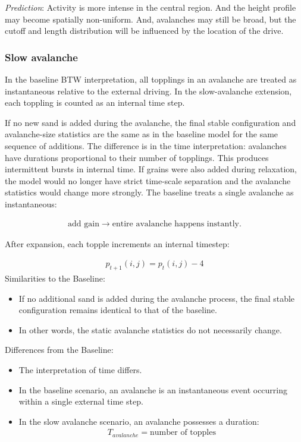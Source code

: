\documentclass{article}
\begin{document}
\textit{Prediction}: Activity is more intense in the central region. And the height profile may become spatially non-uniform. And, avalanches may still be broad, but the cutoff and length distribution will be influenced by the location of the drive.

\subsubsection{Slow avalanche}
In the baseline BTW interpretation, all topplings in an avalanche are treated as instantaneous relative to the external driving. In the slow-avalanche extension, each toppling is counted as an internal time step.

If no new sand is added during the avalanche, the final stable configuration and avalanche-size statistics are the same as in the baseline model for the same sequence of additions. The difference is in the time interpretation: avalanches have durations proportional to their number of topplings. This produces intermittent bursts in internal time. If grains were also added during relaxation, the model would no longer have strict time-scale separation and the avalanche statistics would change more strongly. The baseline treats a single avalanche as instantaneous:

\begin{align}
    \mbox{add gain} \rightarrow \mbox{entire avalanche happens instantly}.
\end{align}

After expansion, each topple increments an internal timestep:

\begin{align}
    p_{t+1} (i,j) = p_t(i,j) - 4
\end{align}
Similarities to the Baseline:

\begin{itemize}
    \item If no additional sand is added during the avalanche process, the final stable configuration remains identical to that of the baseline.
    \item In other words, the static avalanche statistics do not necessarily change.
\end{itemize}

Differences from the Baseline:

\begin{itemize}
    \item The interpretation of time differs.
    \item In the baseline scenario, an avalanche is an instantaneous event occurring within a single external time step.
    \item In the slow avalanche scenario, an avalanche possesses a duration:
    \begin{align}
        T_{avalanche} = \mbox{number of topples}
    \end{align}
\end{itemize}
\end{document}
